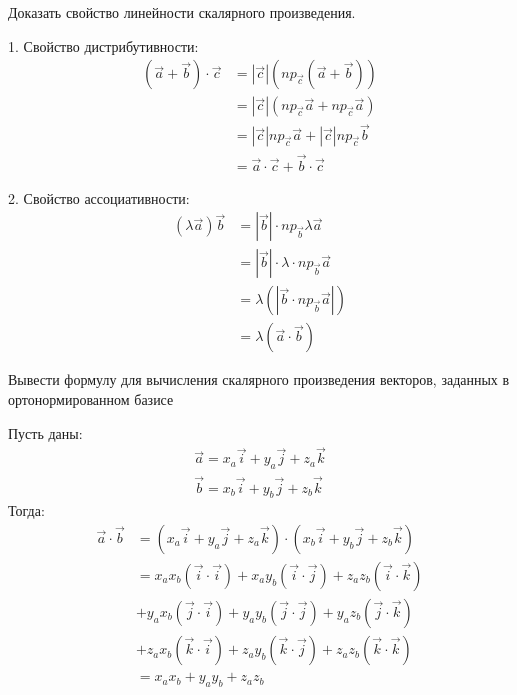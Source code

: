 \begin{question}
  Доказать свойство линейности скалярного произведения.
\end{question}
\begin{answer}
  1. Свойство дистрибутивности:
  \begin{align*}
    (\vec{a} + \vec{b}) \cdot \vec{c} &= |\vec{c}| \left(np_{\vec{c}}(\vec{a} + \vec{b}) \right) \\
                                      &= |\vec{c}| (np_{\vec{c}} \vec{a} + np_{\vec{c}} \vec{a}) \\
                                      &= |\vec{c}| np_{\vec{c}} \vec{a} + |\vec{c}| np_{\vec{c}} \vec{b} \\
                                      &= \vec{a} \cdot \vec{c} + \vec{b} \cdot \vec{c}
  \end{align*}

  2. Свойство ассоциативности:
  \begin{align*}
    (\lambda \vec{a}) \vec{b} &= |\vec{b}| \cdot np_{\vec{b}} \lambda \vec{a} \\
    &= |\vec{b}| \cdot \lambda \cdot np_{\vec{b}} \vec{a} \\
    &= \lambda (|\vec{b} \cdot np_{\vec{b}} \vec{a}|)  \\
    &= \lambda(\vec{a} \cdot \vec{b})
  \end{align*}
\end{answer}

\begin{question}
  Вывести формулу для вычисления скалярного произведения векторов, заданных в ортонормированном базисе
\end{question}
\begin{answer}
  Пусть даны:
  \begin{gather*}
    \vec{a} = x_a \vec{i} + y_a \vec{j} + z_a \vec{k} \\
    \vec{b} = x_b \vec{i} + y_b \vec{j} + z_b \vec{k}
  \end{gather*}
  Тогда:
  \begin{align*}
    \vec{a} \cdot \vec{b} &= \left( x_a \vec{i} + y_a \vec{j} + z_a \vec{k} \right) \cdot \left( x_b \vec{i} + y_b \vec{j} + z_b \vec{k} \right) \\
                          &= x_a x_b (\vec{i} \cdot \vec{i}) + x_a y_b (\vec{i} \cdot \vec{j}) + z_a z_b (\vec{i} \cdot \vec{k}) \\
                          &+ y_a x_b (\vec{j} \cdot \vec{i}) + y_a y_b (\vec{j} \cdot \vec{j}) + y_a z_b (\vec{j} \cdot \vec{k}) \\
                          &+ z_a x_b (\vec{k} \cdot \vec{i}) + z_a y_b (\vec{k} \cdot \vec{j}) + z_a z_b (\vec{k} \cdot \vec{k}) \\
                          &= x_a x_b + y_a y_b + z_a z_b
  \end{align*}
\end{answer}

